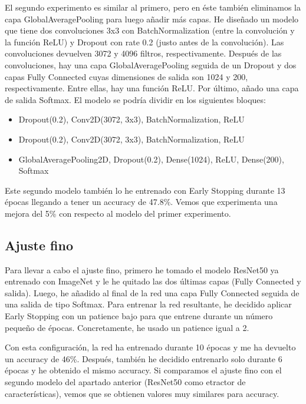 \documentclass[10pt,a4paper]{article}
\begin{document}
El segundo experimento es similar al primero, pero en éste también eliminamos la capa GlobalAveragePooling para luego añadir más capas. He diseñado un modelo que tiene dos convoluciones 3x3 con BatchNormalization (entre la convolución y la función ReLU) y Dropout con rate 0.2 (justo antes de la convolución). Las convoluciones devuelven 3072 y 4096 filtros, respectivamente. Después de las convoluciones, hay una capa GlobalAveragePooling seguida de un Dropout y dos capas Fully Connected cuyas dimensiones de salida son 1024 y 200, respectivamente. Entre ellas, hay una función ReLU. Por último, añado una capa de salida Softmax. El modelo se podría dividir en los siguientes bloques:

\begin{itemize}
\item Dropout(0.2), Conv2D(3072, 3x3), BatchNormalization, ReLU
\item Dropout(0.2), Conv2D(3072, 3x3), BatchNormalization, ReLU
\item GlobalAveragePooling2D, Dropout(0.2), Dense(1024), ReLU, Dense(200), Softmax
\end{itemize}

Este segundo modelo también lo he entrenado con Early Stopping durante 13 épocas llegando a tener un accuracy de 47.8\%. Vemos que experimenta una mejora del 5\% con respecto al modelo del primer experimento.



\subsection{Ajuste fino}

Para llevar a cabo el ajuste fino, primero he tomado el modelo ResNet50 ya entrenado con ImageNet y le he quitado las dos últimas capas (Fully Connected y salida). Luego, he añadido al final de la red una capa Fully Connected seguida de una salida de tipo Softmax. Para entrenar la red resultante, he decidido aplicar Early Stopping con un patience bajo para que entrene durante un número pequeño de épocas. Concretamente, he usado un patience igual a 2.

Con esta configuración, la red ha entrenado durante 10 épocas y me ha devuelto un accuracy de 46\%. Después, también he decidido entrenarlo solo durante 6 épocas y he obtenido el mismo accuracy. Si comparamos el ajuste fino con el segundo modelo del apartado anterior (ResNet50 como etractor de características), vemos que se obtienen valores muy similares para accuracy.
\end{document}
